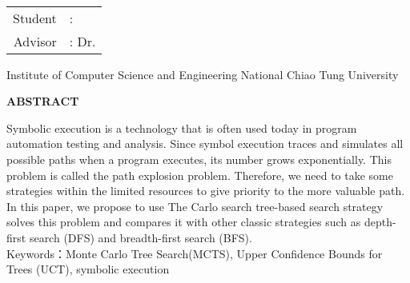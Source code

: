 \begin{titlepage}
  \begin{center}
    \LARGE
    \begin{singlespace}
  	 \textbf{\englishTitle{}} \\[0.5cm]
    \end{singlespace}
    
    \begin{singlespace}
    \begin{tabular}{r l}
    	Student     & : \studentEnName{}  \\
        Advisor  & : Dr. \advisorEnName{} \\[0.5cm]
    \end{tabular}
    \end{singlespace}
	
    \begin{singlespace}
    Institute of Computer Science and Engineering National Chiao Tung University\\[0.5cm]
    \end{singlespace}
    \textbf{ABSTRACT} \\[0.5cm]
    	
  \end{center}
  \normalsize 
  \hspace{0.6cm} Symbolic execution is a technology that is often used today in program automation testing and analysis. Since symbol execution traces and simulates all possible paths when a program executes, its number grows exponentially. This problem is called the path explosion problem. Therefore, we need to take some strategies within the limited resources to give priority to the more valuable path. In this paper, we propose to use The Carlo search tree-based search strategy solves this problem and compares it with other classic strategies such as depth-first search (DFS) and breadth-first search (BFS).
  \\[0.7cm]
  Keywords：Monte Carlo Tree Search(MCTS), Upper Confidence Bounds for Trees (UCT), symbolic execution
\end{titlepage}